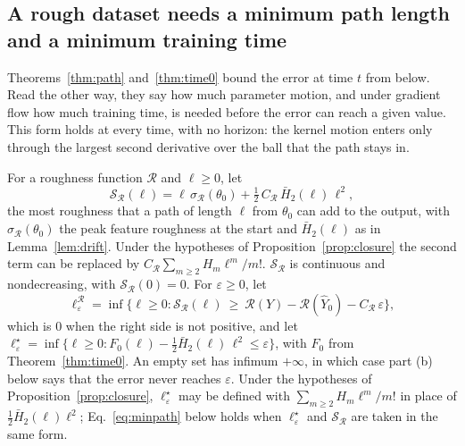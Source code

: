 \documentclass[11pt]{article}
\theoremstyle{definition}
\theoremstyle{remark}
\newcommand{\Rgh}{\mathcal{R}}           %
\newcommand{\sR}{\sigma_{\Rgh}}
\newcommand{\CR}{C_{\Rgh}}
\begin{document}
\subsection{A rough dataset needs a minimum path length and a minimum training time}\label{sec:mintime}

Theorems~\ref{thm:path} and~\ref{thm:time0} bound the error at time $t$ from below.
Read the other way, they say how much parameter motion, and under gradient flow how much training time, is needed before the error can reach a given value.
This form holds at every time, with no horizon: the kernel motion enters only through the largest second derivative over the ball that the path stays in.

For a roughness function $\Rgh$ and $\ell\ge0$, let
\begin{equation}\label{eq:budgetfn}
\mathcal{S}_\Rgh(\ell) = \ell\,\sR(\theta_0) + \tfrac12\,\CR\,\bar H_2(\ell)\,\ell^2 ,
\end{equation}
the most roughness that a path of length $\ell$ from $\theta_0$ can add to the output, with $\sR(\theta_0)$ the peak feature roughness at the start and $\bar H_2(\ell)$ as in Lemma~\ref{lem:drift}.
Under the hypotheses of Proposition~\ref{prop:closure} the second term can be replaced by $\CR\sum_{m\ge2}H_m\ell^m/m!$.
$\mathcal{S}_\Rgh$ is continuous and nondecreasing, with $\mathcal{S}_\Rgh(0) = 0$.
For $\varepsilon\ge0$, let
\begin{equation}\label{eq:elleps}
\ell_\varepsilon^\Rgh = \inf\big\{\ell\ge0 : \mathcal{S}_\Rgh(\ell)\ \ge\ \Rgh(Y) - \Rgh(\hat Y_0) - \CR\,\varepsilon\big\},
\end{equation}
which is $0$ when the right side is not positive, and let $\ell_\varepsilon^\star = \inf\{\ell\ge0 : F_0(\ell) - \tfrac12\bar H_2(\ell)\,\ell^2\le\varepsilon\}$, with $F_0$ from Theorem~\ref{thm:time0}.
An empty set has infimum $+\infty$, in which case part (b) below says that the error never reaches $\varepsilon$.
Under the hypotheses of Proposition~\ref{prop:closure}, $\ell_\varepsilon^\star$ may be defined with $\sum_{m\ge2}H_m\ell^m/m!$ in place of $\tfrac12\bar H_2(\ell)\ell^2$; Eq.~\eqref{eq:minpath} below holds when $\ell_\varepsilon^\star$ and $\mathcal{S}_\Rgh$ are taken in the same form.
\end{document}
